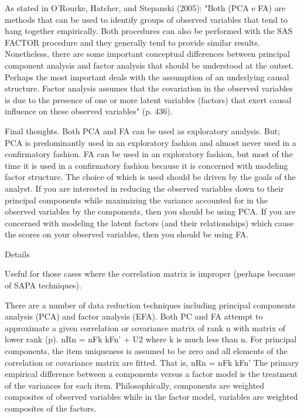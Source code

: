  As stated in O'Rourke, Hatcher, and Stepanski (2005): 
     "Both (PCA e FA) are methods that can be used to identify groups of observed 
      variables that tend to hang together empirically. Both procedures can also 
      be performed with the SAS FACTOR procedure and they generally tend to provide 
      similar results. Nonetheless, there are some important conceptual differences 
      between principal component analysis and factor analysis that should be 
      understood at the outset. Perhaps the most important deals with the assumption 
      of an underlying causal structure. Factor analysis assumes that the covariation 
      in the observed variables is due to the presence of one or more latent variables 
      (factors) that exert causal influence on these observed variables" (p. 436).

 Final thoughts. Both PCA and FA can be used as exploratory analysis. But; PCA is 
 predominantly used in an exploratory fashion and almost never used in a confirmatory 
 fashion. FA can be used in an exploratory fashion, but most of the time it is used 
 in a confirmatory fashion because it is concerned with modeling factor structure. 
 The choice of which is used should be driven by the goals of the analyst. If you 
 are interested in reducing the observed variables down to their principal components 
 while maximizing the variance accounted for in the observed variables by the components, 
 then you should be using PCA. If you are concerned with modeling the latent factors 
 (and their relationships) which cause the scores on your observed variables, then 
 you should be using FA. 


Details

Useful for those cases where the correlation matrix is improper (perhaps because of SAPA techniques).

There are a number of data reduction techniques including principal components analysis (PCA) and factor analysis (EFA). Both PC and FA attempt to approximate a given correlation or covariance matrix of rank n with matrix of lower rank (p). nRn = nFk kFn' + U2 where k is much less than n. For principal components, the item uniqueness is assumed to be zero and all elements of the correlation or covariance matrix are fitted. That is, nRn = nFk kFn' The primary empirical difference between a components versus a factor model is the treatment of the variances for each item. Philosophically, components are weighted composites of observed variables while in the factor model, variables are weighted composites of the factors.


